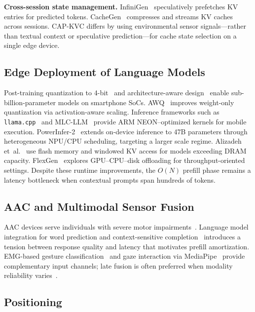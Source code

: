\documentclass[journal]{IEEEtran}
\begin{document}
\textbf{Cross-session state management.} InfiniGen~\cite{infinigen} speculatively prefetches KV entries for predicted tokens. CacheGen~\cite{cachegen} compresses and streams KV caches across sessions. CAP-KVC differs by using environmental sensor signals---rather than textual context or speculative prediction---for cache state selection on a single edge device.

\subsection{Edge Deployment of Language Models}
\label{sec:related_edge}

Post-training quantization to 4-bit~\cite{dettmers2022,frantar2022} and architecture-aware design~\cite{mobilellm} enable sub-billion-parameter models on smartphone SoCs. AWQ~\cite{awq} improves weight-only quantization via activation-aware scaling. Inference frameworks such as \texttt{llama.cpp}~\cite{llamacpp} and MLC-LLM~\cite{mlcllm} provide ARM NEON--optimized kernels for mobile execution. PowerInfer-2~\cite{powerinfer2} extends on-device inference to 47B parameters through heterogeneous NPU/CPU scheduling, targeting a larger scale regime. Alizadeh et~al.~\cite{llminaflash} use flash memory and windowed KV access for models exceeding DRAM capacity. FlexGen~\cite{flexgen} explores GPU--CPU--disk offloading for throughput-oriented settings. Despite these runtime improvements, the $O(N)$ prefill phase remains a latency bottleneck when contextual prompts span hundreds of tokens.

\subsection{AAC and Multimodal Sensor Fusion}
\label{sec:related_aac}

AAC devices serve individuals with severe motor impairments~\cite{beukelman2020}. Language model integration for word prediction and context-sensitive completion~\cite{vertanen2015} introduces a tension between response quality and latency that motivates prefill amortization. EMG-based gesture classification~\cite{ninapro} and gaze interaction via MediaPipe~\cite{mediapipe} provide complementary input channels; late fusion is often preferred when modality reliability varies~\cite{ngiam2011}.

\subsection{Positioning}
\label{sec:positioning}
\end{document}
